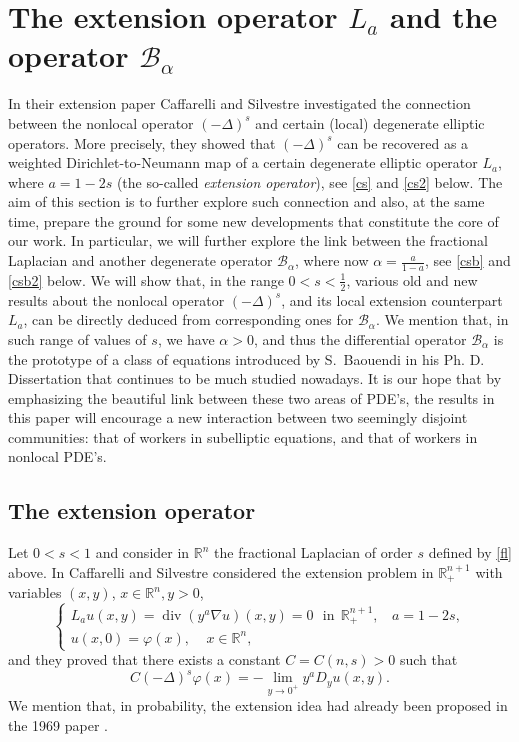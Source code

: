 \documentclass[11pt]{amsart}
\theoremstyle{plain}
\numberwithin{equation}{section}
\begin{document}
\section{The extension operator $L_a$ and the operator $\mathcal B_\alpha$}

In their extension paper \cite{CS} Caffarelli and Silvestre investigated the connection between the nonlocal operator $(-\Delta)^s$ and certain (local) degenerate elliptic operators. More precisely, they showed that $(-\Delta)^s$ can be recovered as a weighted Dirichlet-to-Neumann map of a certain degenerate elliptic operator $L_a$, where $a = 1- 2s$  (the so-called \emph{extension operator}), see \eqref{cs} and \eqref{cs2} below.    The aim of this section is to further explore such connection and also, at the same time, prepare the ground for some new developments that constitute the core of our work. In particular, we will further explore the link between the fractional Laplacian and another degenerate operator ${\mathcal{B}_\alpha}$, where now $\alpha = \frac{a}{1-a}$, see \eqref{csb} and \eqref{csb2} below. We will show that, in the range $0<s<\frac 12$, various old and new results  about the nonlocal operator $(-\Delta)^s$, and its local extension counterpart $L_a$, can be directly deduced from corresponding ones for ${\mathcal{B}_\alpha}$. We mention that, in such range of values of $s$, we have $\alpha>0$, and thus the differential operator ${\mathcal{B}_\alpha}$ is the prototype of a class of equations introduced by S.~Baouendi in his Ph. D. Dissertation that continues to be much studied nowadays. It is our hope that by emphasizing the beautiful link between these two areas of PDE's, the results in this paper will encourage a new interaction between two seemingly disjoint communities: that of workers in subelliptic equations, and that of workers in nonlocal PDE's.

\subsection{The extension operator}\label{SS:ext}
Let $0<s<1$ and consider in ${\mathbb R^n}$ the fractional Laplacian of order $s$ defined by \eqref{fl} above. In \cite{CS} Caffarelli and Silvestre considered the extension problem in ${\mathbb R}^{n+1}_+$ with variables $(x,y)$, $x\in {\mathbb R^n}, y>0$,
\begin{equation}\label{cs}
\begin{cases}
L_a u(x,y) = \operatorname{div}(y^a \nabla u)(x,y) = 0\ \ \ \text{in}\ \ {\mathbb R}^{n+1}_+,\ \ \ \  a = 1-2s,
\\
u(x,0) = {\varphi}(x),\ \ \ \ \ x\in {\mathbb R^n},
\end{cases}
\end{equation}
and they proved that there exists a constant $C = C(n,s)>0$ such that
\begin{equation}\label{cs2}
C (-\Delta)^s {\varphi}(x) = - \underset{y\to 0^+}{\lim} y^a D_yu(x,y).
\end{equation}
We mention that, in probability, the extension idea had already been proposed in the 1969 paper \cite{MO}.
\end{document}
